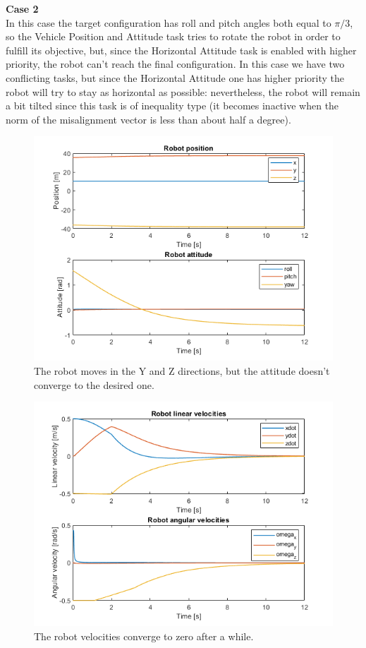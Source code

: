 \documentclass{article}
\begin{document}
{\large \textbf{Case 2}} \\
In this case the target configuration has roll and pitch angles both equal to $ \pi/3 $, so the Vehicle Position and Attitude task tries to rotate the robot in order to fulfill its objective, but, since the Horizontal Attitude task is enabled with higher priority, the robot can't reach the final configuration. In this case we have two conflicting tasks, but since the Horizontal Attitude one has higher priority the robot will try to stay as horizontal as possible: nevertheless, the robot will remain a bit tilted since this task is of inequality type (it becomes inactive when the norm of the misalignment vector is less than about half a degree).

\begin{figure}[H]
	\centering
	\includegraphics[width=0.7\linewidth]{images/Ex1/HorAtt_Enabled_SameStartpos_DifferentEndpos_PosAndAtt}
	\caption{The robot moves in the Y and Z directions, but the attitude doesn't converge to the desired one.}
	\label{fig:q2case2a}
\end{figure}
\begin{figure}[H]
	\centering
	\includegraphics[width=0.7\linewidth]{images/Ex1/HorAtt_Enabled_SameStartpos_DifferentEndpos_LinAngVelocities}
	\caption{The robot velocities converge to zero after a while.}
	\label{fig:q2case2b}
\end{figure}
\end{document}
